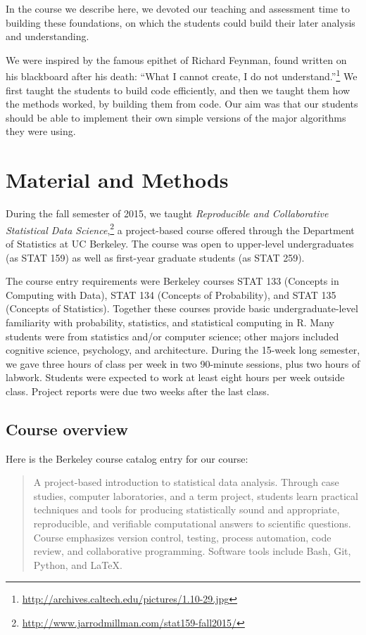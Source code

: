 In the course we describe here, we devoted our teaching and assessment time to
building these foundations, on which the students could build their later
analysis and understanding.

We were inspired by the famous epithet of Richard Feynman, found written on
his blackboard after his death: ``What I cannot create, I do not
understand.''\footnote{\url{http://archives.caltech.edu/pictures/1.10-29.jpg}}
We first taught the students to build code efficiently, and then we taught
them how the methods worked, by building them from code.  Our aim was that our
students should be able to implement their own simple versions of the major
algorithms they were using.

\section{Material and Methods}\label{methods}

During the fall semester of 2015, we taught \emph{Reproducible and Collaborative
Statistical Data Science},\footnote{\url{http://www.jarrodmillman.com/stat159-fall2015/}}
a project-based course offered through the Department of Statistics at UC Berkeley.
The course was open to upper-level undergraduates (as STAT 159) as well as
first-year graduate students (as STAT 259).

The course entry requirements were Berkeley courses STAT 133 (Concepts in
Computing with Data), STAT 134 (Concepts of Probability), and STAT 135
(Concepts of Statistics).  Together these courses provide basic
undergraduate-level familiarity with probability, statistics, and statistical
computing in R.
Many students were from statistics and/or computer science; other majors
included cognitive science, psychology, and architecture.
During the 15-week long semester, we gave three hours of class
per week in two 90-minute sessions, plus two hours of labwork.
Students were expected to work at least eight hours per week outside class.
Project reports were due two weeks after the last class.

\subsection{Course overview}

Here is the Berkeley course catalog entry for our course:

\begin{quote}
A project-based introduction to statistical data analysis. Through case
studies, computer laboratories, and a term project, students learn
practical techniques and tools for producing statistically sound and
appropriate, reproducible, and verifiable computational answers to
scientific questions. Course emphasizes version control, testing,
process automation, code review, and collaborative programming.
Software tools include Bash, Git, Python, and \LaTeX.
\end{quote}

